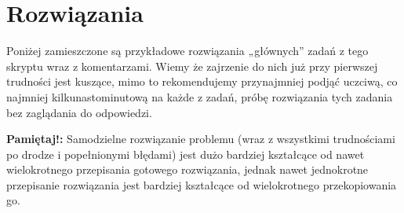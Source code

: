 \section{Rozwiązania}

Poniżej zamieszczone są przykładowe rozwiązania „głównych” zadań z tego skryptu wraz z komentarzami.
Wiemy że zajrzenie do nich już przy pierwszej trudności jest kuszące, mimo to rekomendujemy przynajmniej podjąć uczciwą, co najmniej kilkunastominutową na każde z zadań, próbę rozwiązania tych zadania bez zaglądania do odpowiedzi.

\vspace{7pt}\noindent
\textbf{Pamiętaj!: } Samodzielne rozwiązanie problemu (wraz z wszystkimi trudnościami po drodze i popełnionymi błędami) jest dużo bardziej kształcące od nawet wielokrotnego przepisania gotowego rozwiązania, jednak nawet jednokrotne przepisanie rozwiązania jest bardziej kształcące od wielokrotnego przekopiowania go.
